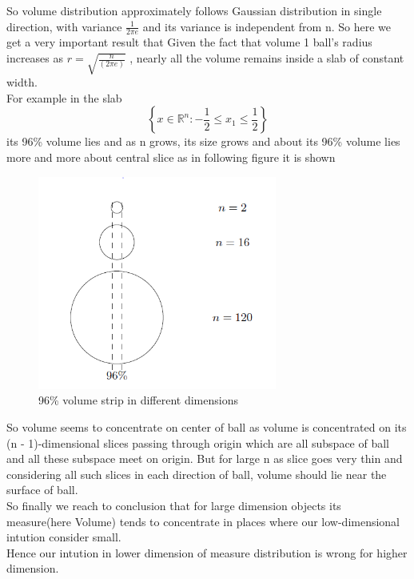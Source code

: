 \documentclass[oneside]{book}
\begin{document}
	So volume distribution approximately follows Gaussian distribution  in  single direction, with variance $\frac{1}{2 \pi e}$
	and its variance is independent from n. So here  we get a very important result that Given the fact that volume 1 ball's radius  increases as $r = \sqrt{\frac{n}{(2 \pi e)}}$ , nearly all the volume remains inside a slab of constant width. \\
	For example in the slab $$\left\{x \in \mathbb{R}^{n}:-\frac{1}{2} \leq x_{1} \leq \frac{1}{2}\right\}$$  its 96\%  volume lies and as n grows, its size grows and about its 96\% volume lies more and more about central slice as in following figure it is shown
	\begin{figure}
		\centering
	\includegraphics[width = 0.7\textwidth]{B2.png}
		\caption{96\% volume strip in different dimensions }
		\label{f:1}
	\end{figure}
	
	
	
	
	
	So volume seems to concentrate on center of ball as volume is concentrated on its  (n - 1)-dimensional slices passing through origin which are all subspace of ball and all these subspace meet on origin. But for large n as slice goes very thin and considering all such slices in each direction of ball, volume should lie near the surface of ball.\\
	
	So finally we reach to conclusion that for large dimension objects its measure(here Volume) tends to concentrate in places where our low-dimensional intution consider small.\\
	Hence our intution in lower dimension of measure distribution is wrong for higher dimension. 
	
\end{document}
